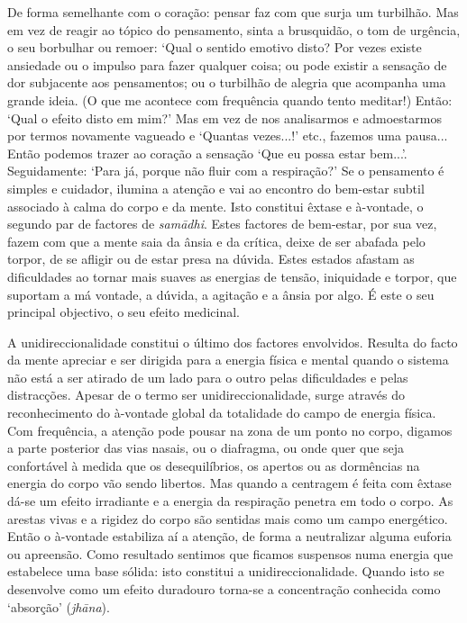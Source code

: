 De forma semelhante com o coração: pensar faz com que surja um turbilhão. Mas em vez de reagir ao tópico do pensamento, sinta a brusquidão, o tom de urgência, o seu borbulhar ou remoer: `Qual o sentido emotivo disto?\textquotesingle{} Por vezes existe ansiedade ou o impulso para fazer qualquer coisa; ou pode existir a sensação de dor subjacente aos pensamentos; ou o turbilhão de alegria que acompanha uma grande ideia. (O que me acontece com frequência quando tento meditar!) Então: `Qual o efeito disto em mim?' Mas em vez de nos analisarmos e admoestarmos por termos novamente vagueado e `Quantas vezes...!' etc., fazemos uma pausa... Então podemos trazer ao coração a sensação `Que eu possa estar bem...'. Seguidamente: `Para já, porque não fluir com a respiração?' Se o pensamento é simples e cuidador, ilumina a atenção e vai ao encontro do bem-estar subtil associado à calma do corpo e da mente. Isto constitui êxtase e à-vontade, o segundo par de factores de \emph{samādhi}. Estes factores de bem-estar, por sua vez, fazem com que a mente saia da ânsia e da crítica, deixe de ser abafada pelo torpor, de se afligir ou de estar presa na dúvida. Estes estados afastam as dificuldades ao tornar mais suaves as energias de tensão, iniquidade e torpor, que suportam a má vontade, a dúvida, a agitação e a ânsia por algo. É este o seu principal objectivo, o seu efeito medicinal.

A unidireccionalidade constitui o último dos factores envolvidos. Resulta do facto da mente apreciar e ser dirigida para a energia física e mental quando o sistema não está a ser atirado de um lado para o outro pelas dificuldades e pelas distracções. Apesar de o termo ser unidireccionalidade, surge através do reconhecimento do à-vontade global da totalidade do campo de energia física. Com frequência, a atenção pode pousar na zona de um ponto no corpo, digamos a parte posterior das vias nasais, ou o diafragma, ou onde quer que seja confortável à medida que os desequilíbrios, os apertos ou as dormências na energia do corpo vão sendo libertos. Mas quando a centragem é feita com êxtase dá-se um efeito irradiante e a energia da respiração penetra em todo o corpo. As arestas vivas e a rigidez do corpo são sentidas mais como um campo energético. Então o à-vontade estabiliza aí a atenção, de forma a neutralizar alguma euforia ou apreensão. Como resultado sentimos que ficamos suspensos numa energia que estabelece uma base sólida: isto constitui a unidireccionalidade. Quando isto se desenvolve como um efeito duradouro torna-se a concentração conhecida como `absorção' (\emph{jhāna}).

